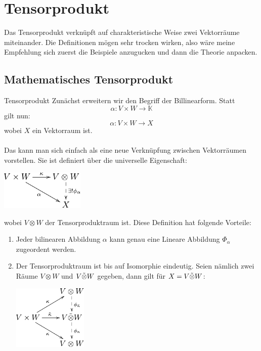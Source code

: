 \newpage
\section[Einführung in die Tensorprodukte]{Tensorprodukt}
Das Tensorprodukt verknüpft auf charakteristische Weise zwei Vektorräume miteinander. Die Definitionen mögen sehr trocken wirken, also wäre meine Empfehlung sich zuerst die Beispiele anzugucken und dann die Theorie anpacken.
\subsection{Mathematisches Tensorprodukt}
\begin{Def}{Tensorprodukt}
    Zunächst erweitern wir den Begriff der Billinearform. Statt
    $$\alpha: V\times W \rightarrow \mathbb{K}$$
    gilt nun:
    $$\alpha: V\times W \rightarrow X$$
    wobei $X$ ein Vektorraum ist. \\ \\
    Das  kann man sich einfach als eine neue Verknüpfung zwischen Vektorräumen vorstellen. Sie ist definiert über die universelle Eigenschaft:
    \begin{center}
    \includegraphics[width=0.3\textwidth]{Dateien/Tensor1.pdf}
\end{center}
wobei $V\otimes W$ der Tensorproduktraum ist. Diese Definition hat folgende Vorteile: \\
\begin{enumerate}
    \item Jeder bilinearen Abbildung $\alpha$ kann genau eine Lineare Abbildung $\Phi_\alpha$ zugeordent werden.
    \item Der Tensorproduktraum ist bis auf Isomorphie eindeutig. Seien nämlich zwei Räume $V\otimes W$ und $V\Tilde{\otimes}W$ gegeben, dann gilt für $X=V\Tilde{\otimes}W$:
\begin{center}
    \includegraphics[width=0.28\textwidth]{Dateien/Tensor2.pdf}

\end{center}
\end{enumerate}
\end{Def}
